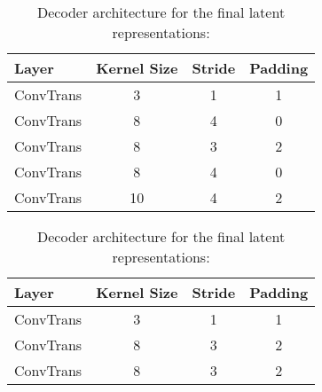 
\begin{table}[htbp]
	\centering
	\renewcommand{\arraystretch}{1.2} %
	\begin{minipage}{0.45\textwidth}
		\centering
		\begin{tabular}{|l|c|c|c|}
			\hline
			\textbf{Layer} & \textbf{Kernel Size} & \textbf{Stride} & \textbf{Padding} \\ \hline
			ConvTrans         & 3                    & 1               & 1                \\ \hline
			ConvTrans         & 8					  & 4				& 0					\\ \hline
			ConvTrans         & 8                    & 3               & 2                \\ \hline
			ConvTrans         & 8					  & 4				& 0					\\ \hline
			ConvTrans         & 10                   & 4               & 2                \\ \hline
		\end{tabular}
		\caption{Decoder architecture for the intermediate latent representations. %
		}
		\label{tab:decoder-architecure-intermidate}
	\end{minipage}
	\hfill
	\begin{minipage}{0.45\textwidth}
		\centering
		\begin{tabular}{|l|c|c|c|}
			\hline
			\textbf{Layer} & \textbf{Kernel Size} & \textbf{Stride} & \textbf{Padding} \\ \hline
			ConvTrans         & 3                    & 1               & 1                \\ \hline
			ConvTrans         & 8                    & 3               & 2                \\ \hline
			ConvTrans         & 8                    & 3               & 2                \\ \hline
		\end{tabular}
		\caption{Decoder architecture for the final latent representations: %
		}
		\label{tab:decoder-architecure-final}
	\end{minipage}
\end{table}



%
